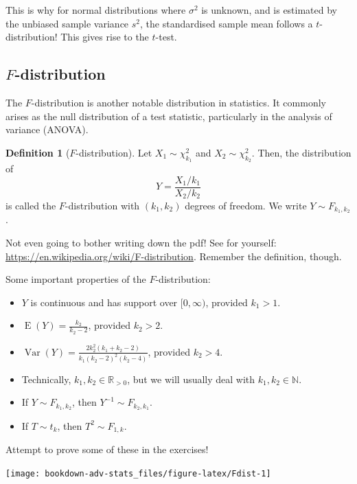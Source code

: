 \documentclass[
]{book}
\providecommand{\tightlist}{%
  \setlength{\itemsep}{0pt}\setlength{\parskip}{0pt}}
\DeclareMathOperator{\E}{E}
\DeclareMathOperator{\Var}{Var}
\newcommand{\bbR}{\mathbb{R}}
\newcommand{\bbN}{\mathbb{N}}
\theoremstyle{definition}
\newtheorem{definition}{Definition}[chapter]
\theoremstyle{definition}
\theoremstyle{definition}
\theoremstyle{definition}
\theoremstyle{remark}
\begin{document}
This is why for normal distributions where \(\sigma^2\) is unknown,
and is estimated by the unbiased sample variance \(s^2\), the standardised
sample mean follows a \(t\)-distribution! This gives rise to the \(t\)-test.

\hypertarget{f-distribution}{%
\subsection{\texorpdfstring{\(F\)-distribution}{F-distribution}}\label{f-distribution}}

The \(F\)-distribution is another notable distribution in
statistics. It commonly arises as the null distribution of a test
statistic, particularly in the analysis of variance (ANOVA).

\begin{definition}[$F$-distribution]
Let \(X_1 \sim \chi^2_{k_1}\) and \(X_2 \sim \chi^2_{k_2}\).
Then, the distribution of \[Y = \frac{X_1/k_1}{X_2/k_2}\] is called the \(F\)-distribution with \((k_1,k_2)\) degrees of freedom.
We write \(Y\sim F_{k_1,k_2}\).
\end{definition}

Not even going to bother writing down the pdf! See for yourself:
\url{https://en.wikipedia.org/wiki/F-distribution}.
Remember the definition, though.

Some important properties of the \(F\)-distribution:

\begin{itemize}
\tightlist
\item
  \(Y\) is continuous and has support over \([0,\infty)\), provided
  \(k_1>1\).
\item
  \(\E(Y)=\frac{k_2}{k_2 - 2}\), provided \(k_2>2\).
\item
  \(\Var(Y) = \frac{2k_2^2(k_1+k_2-2)}{k_1(k_2-2)^2(k_2-4)}\), provided
  \(k_2>4\).
\item
  Technically, \(k_1,k_2\in\bbR_{>0}\), but we will usually deal with
  \(k_1,k_2\in\bbN\).
\item
  If \(Y\sim F_{k_1,k_2}\), then \(Y^{-1}\sim F_{k_2,k_1}\).
\item
  If \(T\sim t_{k}\), then \(T^2 \sim F_{1,k}\).
\end{itemize}

Attempt to prove some of these in the exercises!

\begin{center}\texttt{[image: bookdown-adv-stats\_files/figure-latex/Fdist-1]} \end{center}
\end{document}
